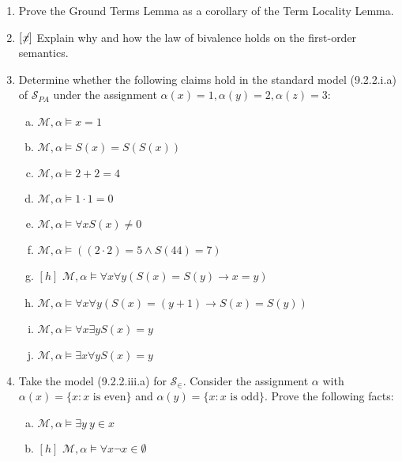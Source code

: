 \begin{enumerate}[\thesection.1]
\begin{enumerate}[(a)]
			\end{enumerate}
			
			\item Prove the Ground Terms Lemma as a corollary of the Term Locality Lemma.
			
			\item $[\not\hspace{-.5ex}x]$ Explain why and how the law of bivalence holds on the first-order semantics.
			
			\item Determine whether the following claims hold in the standard model (9.2.2.i.a) of $\mathcal{S}_{PA}$ under the assignment $\alpha(x)=1, \alpha(y)=2,\alpha(z)=3$:
			
			\begin{enumerate}[(a)]
			
			\item $\mathcal{M},\alpha\vDash x=1$
					\item $\mathcal{M},\alpha\vDash S(x)=S(S(x))$
					\item $\mathcal{M},\alpha\vDash2+2=4$
					\item $\mathcal{M},\alpha\vDash1\cdot1=0$
					\item $\mathcal{M},\alpha\vDash\forall x S(x)\neq 0$
					\item $\mathcal{M},\alpha\vDash((2\cdot 2)=5\land S(44)=7)$
					\item $[h]$ $\mathcal{M},\alpha\vDash\forall x\forall y(S(x)= S(y)\to x= y)$
					\item $\mathcal{M},\alpha\vDash\forall x\forall y(S(x)=(y+1)\to S(x)=S(y))$
					\item $\mathcal{M},\alpha\vDash\forall x\exists yS(x)=y$
					\item $\mathcal{M},\alpha\vDash \exists x\forall yS(x)=y$
			
			\end{enumerate}
						
			
		
		\item Take the model (9.2.2.iii.a) for $\mathcal{S}_\in$. Consider the assignment $\alpha$ with $\alpha(x)=\{x:x\text{ is even}\}$ and $\alpha(y)=\{x:x\text{ is odd}\}$.
		Prove the following facts:
		
		\begin{enumerate}[(a)]
		
			\item  $\mathcal{M},\alpha\vDash \exists y~y\in x$
		
			\item $[h]$ $\mathcal{M},\alpha\vDash\forall x\neg x\in \emptyset$
			

\end{enumerate}
\end{enumerate}
